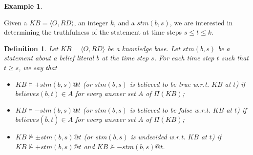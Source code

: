 \documentclass{article}
\newtheorem{example}{Example}%
\newtheorem{definition}{Definition}
\def\naf{\: {not} \:}
\begin{document}
\begin{example}
\begin{itemize}
\end{itemize}  





%
%
%
%
%
%
%
%
%
%
\end{example} 
 
Given a $KB=\langle O, RD \rangle$, 
an integer $k$, and a $stm(b,s)$, we 
are interested in determining the truthfulness of the statement 
at time steps $s \le t \le k$. %

\begin{definition} \label{kb:entail}
Let $KB =  \langle O,RD \rangle$ be a knowledge base. Let $stm(b,s)$ be a statement about a belief literal $b$ at 
the time step $s$. For each time step $t$ such that $t \ge s$, we say that 
\begin{itemize} 
\item $KB \models {+}stm(b,s)@t$ (or $stm(b, s)$ 
is believed to be \emph{true} w.r.t. $KB$ at   $t$)  if  $believes(b,t) \in A$ for every answer set $A$ of $\Pi(KB)$; 
\item $KB \models {-}stm(b,s)@t$ (or 
$stm(b, s)$ 
is believed to be \emph{false} w.r.t. $KB$  at  $t$)  if  $believes(\overline{b},t) \in A$ for every answer set $A$ of $\Pi(KB)$;
\item $KB \not\models {\pm}stm(b,s)@t$ (or 
$stm(b, s)$ 
is \emph{undecided} w.r.t. $KB$  at  $t$)    
if $KB \not\models +stm(b,s)@t$ and $KB \not\models -stm(b,s)@t$.

\end{itemize}  
\end{definition} 
\end{document}
